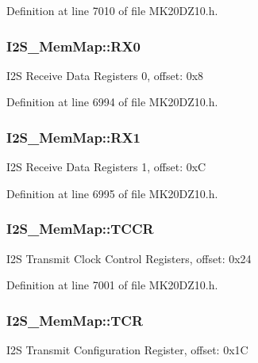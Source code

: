 Definition at line 7010 of file M\+K20\+D\+Z10.\+h.

\subsubsection[{\texorpdfstring{R\+X0}{RX0}}]{ I2\+S\+\_\+\+Mem\+Map\+::\+R\+X0}\hypertarget{struct_i2_s___mem_map_a9f68e4b1fd2757be357725a08c081287}{}\label{struct_i2_s___mem_map_a9f68e4b1fd2757be357725a08c081287}
I2S Receive Data Registers 0, offset\+: 0x8 

Definition at line 6994 of file M\+K20\+D\+Z10.\+h.

\subsubsection[{\texorpdfstring{R\+X1}{RX1}}]{ I2\+S\+\_\+\+Mem\+Map\+::\+R\+X1}\hypertarget{struct_i2_s___mem_map_ae491d91f7f10617298503afaa8225931}{}\label{struct_i2_s___mem_map_ae491d91f7f10617298503afaa8225931}
I2S Receive Data Registers 1, offset\+: 0xC 

Definition at line 6995 of file M\+K20\+D\+Z10.\+h.

\subsubsection[{\texorpdfstring{T\+C\+CR}{TCCR}}]{ I2\+S\+\_\+\+Mem\+Map\+::\+T\+C\+CR}\hypertarget{struct_i2_s___mem_map_a10575d5e8c3a2232c58f9d499c6b3dde}{}\label{struct_i2_s___mem_map_a10575d5e8c3a2232c58f9d499c6b3dde}
I2S Transmit Clock Control Registers, offset\+: 0x24 

Definition at line 7001 of file M\+K20\+D\+Z10.\+h.

\subsubsection[{\texorpdfstring{T\+CR}{TCR}}]{ I2\+S\+\_\+\+Mem\+Map\+::\+T\+CR}\hypertarget{struct_i2_s___mem_map_ab1a921688c842e929273e0f0de44a980}{}\label{struct_i2_s___mem_map_ab1a921688c842e929273e0f0de44a980}
I2S Transmit Configuration Register, offset\+: 0x1C 

